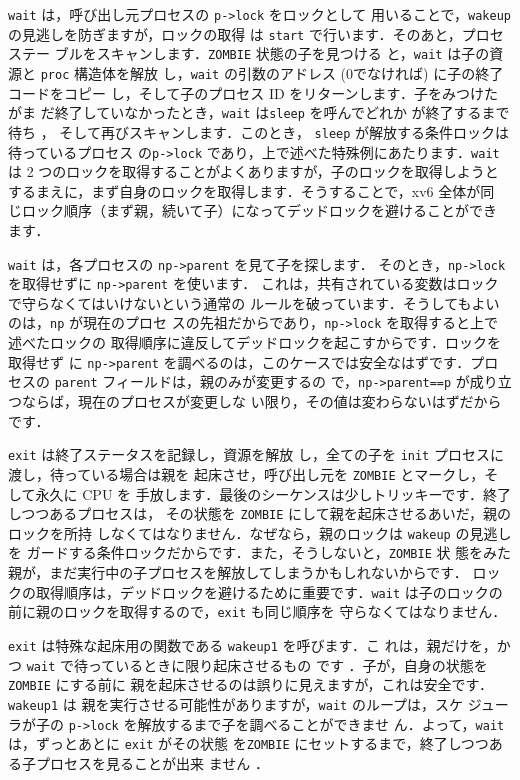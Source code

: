 \lstinline{wait} は，呼び出し元プロセスの \lstinline{p->lock} をロックとして
用いることで，\lstinline{wakeup} の見逃しを防ぎますが，ロックの取得
は \lstinline{start}
で行います．そのあと，プロセステー
ブルをスキャンします．\lstinline{ZOMBIE} 状態の子を見つける
と，\lstinline{wait} は子の資源と \lstinline{proc} 構造体を解放
し，\lstinline{wait} の引数のアドレス (0でなければ) に子の終了コードをコピー
し，そして子のプロセス ID をリターンします．子をみつけたがま
だ終了していなかったとき，\lstinline{wait} は\lstinline{sleep} を呼んでどれか
が終了するまで待ち
，
そして再びスキャンします．このとき，
\lstinline{sleep} が解放する条件ロックは待っているプロセス
の\lstinline{p->lock} であり，上で述べた特殊例にあたります．\lstinline{wait}
は 2 つのロックを取得することがよくありますが，子のロックを取得しようと
するまえに，まず自身のロックを取得します．そうすることで，xv6 全体が同
じロック順序（まず親，続いて子）になってデッドロックを避けることができ
ます．

\texttt{wait} は，各プロセスの \texttt{np->parent} を見て子を探します．
そのとき，\texttt{np->lock} を取得せずに \texttt{np->parent} を使います．
これは，共有されている変数はロックで守らなくてはいけないという通常の
ルールを破っています．そうしてもよいのは，\texttt{np} が現在のプロセ
スの先祖だからであり，\texttt{np->lock} を取得すると上で述べたロックの
取得順序に違反してデッドロックを起こすからです．ロックを取得せず
に \texttt{np->parent} を調べるのは，このケースでは安全なはずです．プロ
セスの \texttt{parent} フィールドは，親のみが変更するの
で，\texttt{np->parent==p} が成り立つならば，現在のプロセスが変更しな
い限り，その値は変わらないはずだからです．

\texttt{exit}
は終了ステータスを記録し，資源を解放
し，全ての子を \texttt{init} プロセスに渡し，待っている場合は親を
起床させ，呼び出し元を \texttt{ZOMBIE} とマークし，そして永久に CPU を
手放します．最後のシーケンスは少しトリッキーです．終了しつつあるプロセスは，
その状態を \texttt{ZOMBIE} にして親を起床させるあいだ，親のロックを所持
しなくてはなりません．なぜなら，親のロックは \texttt{wakeup} の見逃しを
ガードする条件ロックだからです．また，そうしないと，\texttt{ZOMBIE} 状
態をみた親が，まだ実行中の子プロセスを解放してしまうかもしれないからです．
ロックの取得順序は，デッドロックを避けるために重要です．\texttt{wait}
は子のロックの前に親のロックを取得するので，\texttt{exit} も同じ順序を
守らなくてはなりません．

\texttt{exit} は特殊な起床用の関数である \texttt{wakeup1} を呼びます．こ
れは，親だけを，かつ \texttt{wait} で待っているときに限り起床させるもの
です ．子が，自身の状態を\texttt{ZOMBIE} にする前に
親を起床させるのは誤りに見えますが，これは安全です．\texttt{wakeup1} は
親を実行させる可能性がありますが，\texttt{wait} のループは，スケ
ジューラが子の \texttt{p->lock} を解放するまで子を調べることができませ
ん．よって，\texttt{wait} は，ずっとあとに \texttt{exit} がその状態
を\texttt{ZOMBIE} にセットするまで，終了しつつある子プロセスを見ることが出来
ません ．

